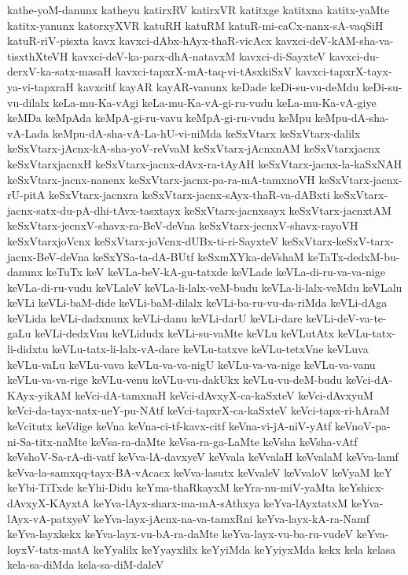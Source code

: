 {kathe-yoM-danunx
katheyu
katirxRV
katirxVR
katitxge
katitxna
katitx-yaMte
katitx-yanunx
katorxyXVR
katuRH
katuRM
katuR-mi-caCx-nanx-sA-vaqSiH
katuR-riV-pisxta
kavx
kavxci-dAbx-hAyx-thaR-vicAcx
kavxci-deV-kAM-sha-va-tisxthXteVH
kavxci-deV-ka-parx-dhA-natavxM
kavxci-di-SayxteV
kavxci-du-derxV-ka-satx-masaH
kavxci-tapxrX-mA-taq-vi-tAsxkiSxV
kavxci-tapxrX-tayx-ya-vi-tapxraH
kavxcitf
kayAR
kayAR-vanunx
keDade
keDi-su-vu-deMdu
keDi-su-vu-dilalx
keLa-mu-Ka-vAgi
keLa-mu-Ka-vA-gi-ru-vudu
keLa-mu-Ka-vA-giye
keMDa
keMpAda
keMpA-gi-ru-vavu
keMpA-gi-ru-vudu
keMpu
keMpu-dA-sha-vA-Lada
keMpu-dA-sha-vA-La-hU-vi-niMda
keSxVtarx
keSxVtarx-dalilx
keSxVtarx-jAcnx-kA-sha-yoV-reVvaM
keSxVtarx-jAcnxnAM
keSxVtarxjacnx
keSxVtarxjacnxH
keSxVtarx-jacnx-dAvx-ra-tAyAH
keSxVtarx-jacnx-la-kaSxNAH
keSxVtarx-jacnx-nanenx
keSxVtarx-jacnx-pa-ra-mA-tamxnoVH
keSxVtarx-jacnx-rU-pitA
keSxVtarx-jacnxra
keSxVtarx-jacnx-sAyx-thaR-va-dABxti
keSxVtarx-jacnx-satx-du-pA-dhi-tAvx-tasxtayx
keSxVtarx-jacnxsayx
keSxVtarx-jacnxtAM
keSxVtarx-jecnxV-shavx-ra-BeV-deVna
keSxVtarx-jecnxV-shavx-rayoVH
keSxVtarxjoVcnx
keSxVtarx-joVcnx-dUBx-ti-ri-SayxteV
keSxVtarx-keSxV-tarx-jacnx-BeV-deVna
keSxYSa-ta-dA-BUtf
keSxmXYka-deVshaM
keTaTx-dedxM-bu-danunx
keTuTx
keV
keVLa-beV-kA-gu-tatxde
keVLade
keVLa-di-ru-va-va-nige
keVLa-di-ru-vudu
keVLaleV
keVLa-li-lalx-veM-budu
keVLa-li-lalx-veMdu
keVLalu
keVLi
keVLi-baM-dide
keVLi-baM-dilalx
keVLi-ba-ru-vu-da-riMda
keVLi-dAga
keVLida
keVLi-dadxnunx
keVLi-danu
keVLi-darU
keVLi-dare
keVLi-deV-va-te-gaLu
keVLi-dedxVnu
keVLidudx
keVLi-su-vaMte
keVLu
keVLutAtx
keVLu-tatx-li-didxtu
keVLu-tatx-li-lalx-vA-dare
keVLu-tatxve
keVLu-tetxVne
keVLuva
keVLu-vaLu
keVLu-vava
keVLu-va-va-nigU
keVLu-va-va-nige
keVLu-va-vanu
keVLu-va-va-rige
keVLu-venu
keVLu-vu-dakUkx
keVLu-vu-deM-budu
keVci-dA-KAyx-yikAM
keVci-dA-tamxnaH
keVci-dAvxyX-ca-kaSxteV
keVci-dAvxyuM
keVci-da-tayx-natx-neY-pu-NAtf
keVci-tapxrX-ca-kaSxteV
keVci-tapx-ri-hAraM
keVcitutx
keVdige
keVna
keVna-ci-tf-kavx-citf
keVna-vi-jA-niV-yAtf
keVnoV-pa-ni-Sa-titx-naMte
keVsa-ra-daMte
keVsa-ra-ga-LaMte
keVsha
keVsha-vAtf
keVshoV-Sa-rA-di-vatf
keVva-lA-davxyeV
keVvala
keVvalaH
keVvalaM
keVva-lamf
keVva-la-samxqq-tayx-BA-vAcacx
keVva-lasutx
keVvaleV
keVvaloV
keVyaM
keY
keYbi-TiTxde
keYhi-Didu
keYma-thaRkayxM
keYra-nu-miV-yaMta
keYshicx-dAvxyX-KAyxtA
keYva-lAyx-sharx-ma-mA-sAthxya
keYva-lAyxtatxM
keYva-lAyx-vA-patxyeV
keYva-layx-jAcnx-na-va-tamxRni
keYva-layx-kA-ra-Namf
keYva-layxkekx
keYva-layx-vu-bA-ra-daMte
keYva-layx-vu-ba-ru-vudeV
keYva-loyxV-tatx-matA
keYyalilx
keYyayxlilx
keYyiMda
keYyiyxMda
kekx
kela
kelasa
kela-sa-diMda
kela-sa-diM-daleV
}
